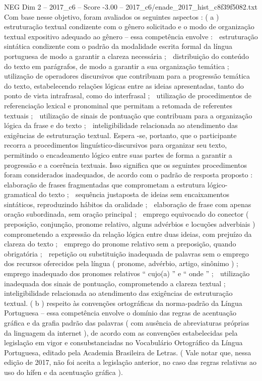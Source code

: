 \begin{textsample}{NEG Dim 2 – 2017\_c6 – Score -3.00 – 2017\_c6/enade\_2017\_hist\_c8f39f5082.txt}
Com base nesse objetivo, foram avaliados os seguintes aspectos : ( a ) estruturação textual condizente com o gênero solicitado e o modo de organização textual expositivo adequado ao gênero – essa competência envolve :  estruturação sintática condizente com o padrão da modalidade escrita formal da língua portuguesa de modo a garantir a clareza necessária ;  distribuição do conteúdo do texto em parágrafos, de modo a garantir a sua organização temática ;  utilização de operadores discursivos que contribuam para a progressão temática do texto, estabelecendo relações lógicas entre as ideias apresentadas, tanto do ponto de vista intrafrasal, como do interfrasal ;  utilização de procedimentos de referenciação lexical e pronominal que permitam a retomada de referentes textuais ;  utilização de sinais de pontuação que contribuam para a organização lógica da frase e do texto ;  inteligibilidade relacionada ao atendimento das exigências de estruturação textual.
Espera -se, portanto, que o participante recorra a procedimentos linguístico-discursivos para organizar seu texto, permitindo o encadeamento lógico entre suas partes de forma a garantir a progressão e a coerência textuais.
Isso significa que os seguintes procedimentos foram considerados inadequados, de acordo com o padrão de resposta proposto :  elaboração de frases fragmentadas que comprometam a estrutura lógico-gramatical do texto ;  sequência justaposta de ideias sem encaixamentos sintáticos, reproduzindo hábitos da oralidade ;  elaboração de frase com apenas oração subordinada, sem oração principal ;  emprego equivocado do conector ( preposição, conjunção, pronome relativo, alguns advérbios e locuções adverbiais ) comprometendo a expressão da relação lógica entre duas ideias, com prejuízo da clareza do texto ;  emprego do pronome relativo sem a preposição, quando obrigatória ;  repetição ou substituição inadequada de palavras sem o emprego dos recursos oferecidos pela língua ( pronome, advérbio, artigo, sinônimo ) ;  emprego inadequado dos pronomes relativos “ cujo(a) ” e “ onde ” ;  utilização inadequada dos sinais de pontuação, comprometendo a clareza textual ;  inteligibilidade relacionada ao atendimento das exigências de estruturação textual. ( b ) respeito às convenções ortográficas da norma-padrão da Língua Portuguesa – essa competência envolve o domínio das regras de acentuação gráfica e da grafia padrão das palavras ( com ausência de abreviaturas próprias da linguagem da internet ), de acordo com as convenções estabelecidas pela legislação em vigor e consubstanciadas no Vocabulário Ortográfico da Língua Portuguesa, editado pela Academia Brasileira de Letras. ( Vale notar que, nessa edição de 2017, não foi aceita a legislação anterior, no caso das regras relativas ao uso do hífen e da acentuação gráfica ).

\end{textsample}
